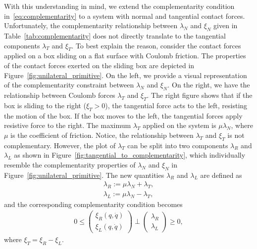 With this understanding in mind, we extend the complementarity condition
in~\eqref{eq:complementarity} to a system with normal and tangential contact
forces.
%
Unfortunately, the complementarity relationship between $\lambda_N$ and $\xi_N$
given in Table~\ref{tab:complementarity} does not directly translate to the
tangential components $\lambda_T$ and $\xi_T$.
%
%
To best explain the reason, consider the contact forces applied on a box sliding
on a flat surface with Coulomb friction.
%
The properties of the contact forces exerted on the sliding box are depicted in
Figure~\ref{fig:unilateral_primitive}.
%
On the left, we provide a visual representation of the complementarity
constraint between $\lambda_N$ and $\xi_N$.
%
On the right, we have the relationship between Coulomb forces $\lambda_T$ and
$\xi_T$.
%
The right figure shows that if the box is sliding to the right ($\xi_T > 0$),
the tangential force acts to the left, resisting the motion of the box.
%
If the box moves to the left, the tangential forces apply resistive force to
the right.
%
The maximum $\lambda_T$ applied on the system is $\mu \lambda_N$, where $\mu$ is
the coefficient of friction.
%
Notice, the relationship between $\lambda_T$ and $\xi_T$ is not complementary.
%
However, the plot of $\lambda_T$ can be split into two components $\lambda_R$
and $\lambda_L$ as shown in Figure~\ref{fig:tangential_to_complementarity},
which individually resemble the complementarity properties of $\lambda_N$ and
$\xi_N$ in Figure~\ref{fig:unilateral_primitive}.
%
The new quantities $\lambda_R$ and $\lambda_L$ are defined as~\cite{glocker2005formulation}
\begin{align*}
  \lambda_R := \mu \lambda_N + \lambda_T, \\
  \lambda_L := \mu \lambda_N - \lambda_T, 
\end{align*}
\noindent and the corresponding complementarity condition becomes
%
\begin{equation}
  \begin{gathered}
    0 \leq 
    \begin{pmatrix}
      \xi_R(q, \dot{q}) \\
      \xi_L(q, \dot{q})
    \end{pmatrix} 
    \perp
      \begin{pmatrix}
        \lambda_R  \\
        \lambda_L
      \end{pmatrix} \geq 0,
    \end{gathered}
    \label{eq:tangential_complementarity}
\end{equation}
where $\xi_T = \xi_R - \xi_L$.
%

